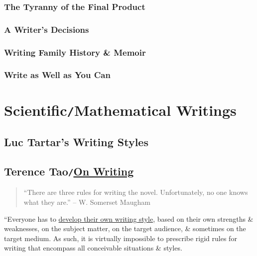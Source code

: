 \documentclass[oneside]{book}
\numberwithin{equation}{section}
\begin{document}
\section{The Tyranny of the Final Product}

\section{A Writer's Decisions}

\section{Writing Family History \& Memoir}

\section{Write as Well as You Can}


\part{Scientific\texttt{/}Mathematical Writings}

\chapter{Luc Tartar's Writing Styles}


\chapter{Terence Tao\texttt{/}\href{https://terrytao.wordpress.com/advice-on-writing-papers/}{On Writing}}
\begin{quotation}
	``There are three rules for writing the novel. Unfortunately, no one knows what they are.'' -- W. Somerset Maugham
\end{quotation}
``Everyone has to \href{https://terrytao.wordpress.com/advice-on-writing-papers/write-in-your-own-voice/}{develop their own writing style}, based on their own strengths \& weaknesses, on the subject matter, on the target audience, \& sometimes on the target medium. As such, it is virtually impossible to prescribe rigid rules for writing that encompass all conceivable situations \& styles.
\end{document}
